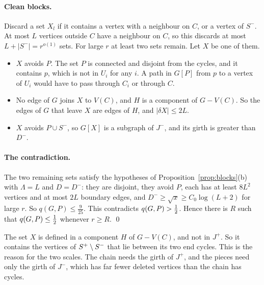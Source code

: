 \paragraph{Clean blocks.}
Discard a set $X_l$ if it contains a vertex with a neighbour on $C$, or a vertex of $S^{-}$. At most
$L$ vertices outside $C$ have a neighbour on $C$, so this discards at most
$L+|S^{-}|=r^{o(1)}$ sets. For large $r$ at least two sets remain. Let $X$ be one of them.
\begin{itemize}
\item $X$ avoids $P$. The set $P$ is connected and disjoint from the cycles, and it contains $p$,
which is not in $U_i$ for any $i$. A path in $G[P]$ from $p$ to a vertex of $U_i$ would have to pass
through $C_i$ or through $C$.
\item No edge of $G$ joins $X$ to $V(C)$, and $H$ is a component of $G-V(C)$. So the edges of $G$
that leave $X$ are edges of $H$, and $|\delta X|\le2L$.
\item $X$ avoids $P\cup S^{-}$, so $G[X]$ is a subgraph of $J^{-}$, and its girth is greater than
$D^{-}$.
\end{itemize}

\paragraph{The contradiction.}
The two remaining sets satisfy the hypotheses of Proposition~\ref{prop:blocks}(b) with
$\Lambda=L$ and $D=D^{-}$: they are disjoint, they avoid $P$, each has at least $8L^{2}$ vertices
and at most $2L$ boundary edges, and $D^{-}\ge\sqrt x\ge C_0\log(L+2)$ for large $r$. So
$q(G,P)\le\frac9{25}$. This contradicts $q(G,P)>\tfrac12$. Hence there is $R$ such that
$q(G,P)\le\tfrac12$ whenever $r\ge R$. \qed

\begin{remark}\label{rem:restore}
The set $X$ is defined in a component $H$ of $G-V(C)$, and not in $J^{+}$. So it contains the vertices of
$S^{+}\setminus S^{-}$ that lie between its two end cycles. This is the reason for the two scales. The
chain needs the girth of $J^{+}$, and the pieces need only the girth of $J^{-}$, which has far fewer
deleted vertices than the chain has cycles.
\end{remark}

